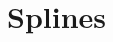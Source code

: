 \documentclass[../book/calcnotes.tex]{subfiles}
\begin{document}
\section{Splines}
\label{sec:splines}

\begin{gps}
\end{gps}

\begin{exercises}
\end{exercises}
\end{document}
